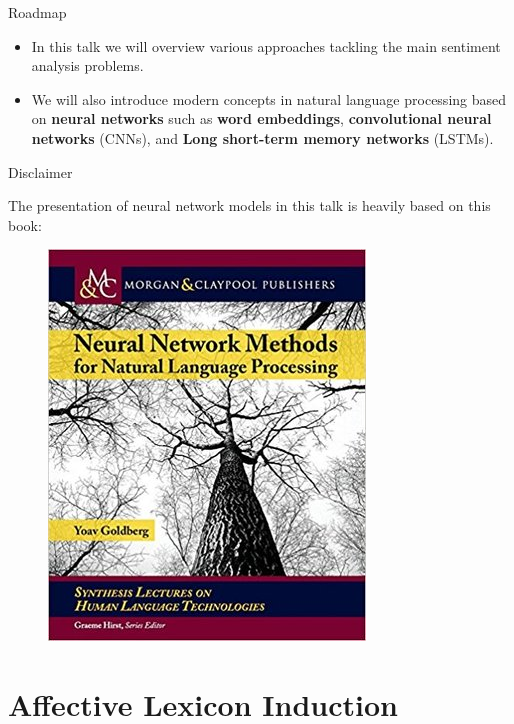 \documentclass[handout]{beamer}
\begin{document}
\begin{frame}{Roadmap}
\begin{scriptsize}
\begin{itemize}
\item In this talk we will overview various approaches tackling the main sentiment analysis problems.
\item We will also introduce modern concepts in natural language processing based on \textbf{neural networks} such as \textbf{word embeddings}, \textbf{convolutional neural networks} (CNNs), and \textbf{Long short-term memory networks} (LSTMs).
\end{itemize} 

\end{scriptsize}

\end{frame}

\begin{frame}{Disclaimer}

 The presentation of neural network models in this talk is heavily based on this book:
   \begin{figure}[h]
        	\includegraphics[scale = 0.4]{pics/goldbergNLP.jpg}
        \end{figure}

 
\end{frame}



\section{Affective Lexicon Induction}
%
\end{document}
